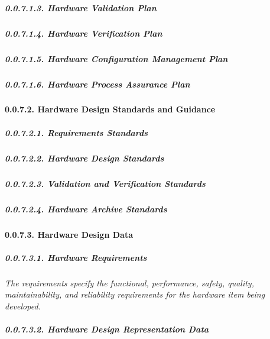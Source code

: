 \documentclass[
]{article}
\begin{document}
\hypertarget{hardware-validation-plan}{%
\subparagraph{0.0.7.1.3. Hardware Validation
Plan}\label{hardware-validation-plan}}

\hypertarget{hardware-verification-plan}{%
\subparagraph{0.0.7.1.4. Hardware Verification
Plan}\label{hardware-verification-plan}}

\hypertarget{hardware-configuration-management-plan}{%
\subparagraph{0.0.7.1.5. Hardware Configuration Management
Plan}\label{hardware-configuration-management-plan}}

\hypertarget{hardware-process-assurance-plan}{%
\subparagraph{0.0.7.1.6. Hardware Process Assurance
Plan}\label{hardware-process-assurance-plan}}

\hypertarget{hardware-design-standards-and-guidance}{%
\paragraph{0.0.7.2. Hardware Design Standards and
Guidance}\label{hardware-design-standards-and-guidance}}

\hypertarget{requirements-standards}{%
\subparagraph{0.0.7.2.1. Requirements
Standards}\label{requirements-standards}}

\hypertarget{hardware-design-standards}{%
\subparagraph{0.0.7.2.2. Hardware Design
Standards}\label{hardware-design-standards}}

\hypertarget{validation-and-verification-standards}{%
\subparagraph{0.0.7.2.3. Validation and Verification
Standards}\label{validation-and-verification-standards}}

\hypertarget{hardware-archive-standards}{%
\subparagraph{0.0.7.2.4. Hardware Archive
Standards}\label{hardware-archive-standards}}

\hypertarget{hardware-design-data}{%
\paragraph{0.0.7.3. Hardware Design Data}\label{hardware-design-data}}

\hypertarget{hardware-requirements}{%
\subparagraph{0.0.7.3.1. Hardware
Requirements}\label{hardware-requirements}}

\emph{The requirements specify the functional, performance, safety,
quality, maintainability, and reliability requirements for the hardware
item being developed.}

\hypertarget{hardware-design-representation-data}{%
\subparagraph{0.0.7.3.2. Hardware Design Representation
Data}\label{hardware-design-representation-data}}
\end{document}
